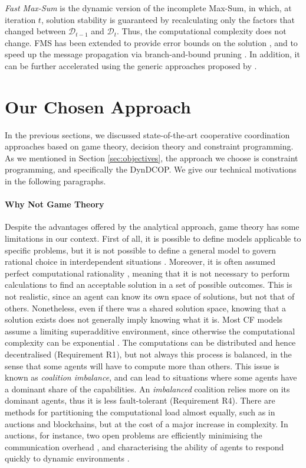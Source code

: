 \emph{Fast Max-Sum} \cite{ramchurn2010fms} is the dynamic version of the incomplete
Max-Sum, in which, at iteration $t$, solution stability is guaranteed by recalculating
only the factors that changed between $\mathcal{D}_{t - 1}$ and $\mathcal{D}_t$. Thus, the
computational complexity does not change. FMS has been extended to provide error bounds on
the solution \cite{macarthur2010}, and to speed up the message propagation via
branch-and-bound pruning \cite{macarthur2011}. In addition, it can be further accelerated
using the generic approaches proposed by \cite{khan2018,chen2019,zaoad2021}.
\clearpage

\section{Our Chosen Approach}\label{chap2:choice}

In the previous sections, we discussed state-of-the-art cooperative coordination
approaches based on game theory, decision theory and constraint programming. As we
mentioned in Section \ref{sec:objectives}, the approach we choose is constraint
programming, and specifically the DynDCOP. We give our technical motivations in the
following paragraphs.

\paragraph{Why Not Game Theory}

Despite the advantages offered by the analytical approach, game theory has some
limitations in our context. First of all, it is possible to define models applicable to
specific problems, but it is not possible to define a general model to govern rational
choice in interdependent situations \cite{zeng1996}. Moreover, it is often assumed
perfect computational rationality \cite{lewis2014,gershman2015}, meaning that it is not
necessary to perform calculations to find an acceptable solution in a set of possible
outcomes. This is not realistic, since an agent can know its own space of solutions, but
not that of others. Nonetheless, even if there was a shared solution space, knowing that a
solution exists does not generally imply knowing what it is.
Most CF models assume a limiting superadditive environment, since otherwise the
computational complexity can be exponential \cite[Section $2.2$]{sandholm1999}. The
computations can be distributed and hence decentralised (Requirement R1), but not always
this process is balanced, in the sense that some agents will have to compute more
than others. This issue is known as \emph{coalition imbalance}, and can lead to situations
where some agents have a dominant share of the capabilities. An \emph{imbalanced}
coalition relies more on its dominant agents, thus it is less fault-tolerant (Requirement
R4).
There are methods for partitioning the computational load almost equally, such as in
auctions and blockchains, but at the cost of a major increase in complexity. In auctions,
for instance, two open problems are efficiently minimising the communication overhead
\cite{gerkey2004}, and characterising the ability of agents to respond quickly to dynamic
environments \cite{dias2006}.

